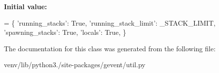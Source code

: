 {\bfseries Initial value\+:}
\begin{DoxyCode}
=  \{
        \textcolor{stringliteral}{'running\_stacks'}: \textcolor{keyword}{True},
        \textcolor{stringliteral}{'running\_stack\_limit'}: \_STACK\_LIMIT,
        \textcolor{stringliteral}{'spawning\_stacks'}: \textcolor{keyword}{True},
        \textcolor{stringliteral}{'locals'}: \textcolor{keyword}{True},
    \}
\end{DoxyCode}


The documentation for this class was generated from the following file\+:\begin{DoxyCompactItemize}
\item 
venv/lib/python3./site-\/packages/gevent/util.\+py\end{DoxyCompactItemize}
